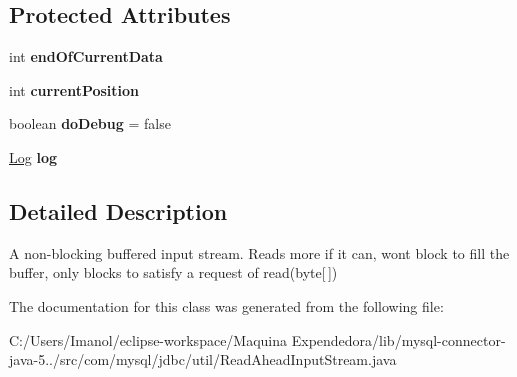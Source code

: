 \subsection*{Protected Attributes}
\begin{DoxyCompactItemize}
\item 
\mbox{\label{classcom_1_1mysql_1_1jdbc_1_1util_1_1_read_ahead_input_stream_aca90e86b4e6a78fa24d62f6757282bc8}} 
int {\bfseries end\+Of\+Current\+Data}
\item 
\mbox{\label{classcom_1_1mysql_1_1jdbc_1_1util_1_1_read_ahead_input_stream_a109841d9667c5737bea726b174ebba57}} 
int {\bfseries current\+Position}
\item 
\mbox{\label{classcom_1_1mysql_1_1jdbc_1_1util_1_1_read_ahead_input_stream_af03f1043aa6664c496d6960bc16a364e}} 
boolean {\bfseries do\+Debug} = false
\item 
\mbox{\label{classcom_1_1mysql_1_1jdbc_1_1util_1_1_read_ahead_input_stream_a2492b16d9e7a4501719cdf99ceb8275a}} 
\mbox{\hyperlink{interfacecom_1_1mysql_1_1jdbc_1_1log_1_1_log}{Log}} {\bfseries log}
\end{DoxyCompactItemize}


\subsection{Detailed Description}
A non-\/blocking buffered input stream. Reads more if it can, won\textquotesingle{}t block to fill the buffer, only blocks to satisfy a request of read(byte\mbox{[}$\,$\mbox{]}) 

The documentation for this class was generated from the following file\+:\begin{DoxyCompactItemize}
\item 
C\+:/\+Users/\+Imanol/eclipse-\/workspace/\+Maquina Expendedora/lib/mysql-\/connector-\/java-\/5../src/com/mysql/jdbc/util/Read\+Ahead\+Input\+Stream.\+java\end{DoxyCompactItemize}
